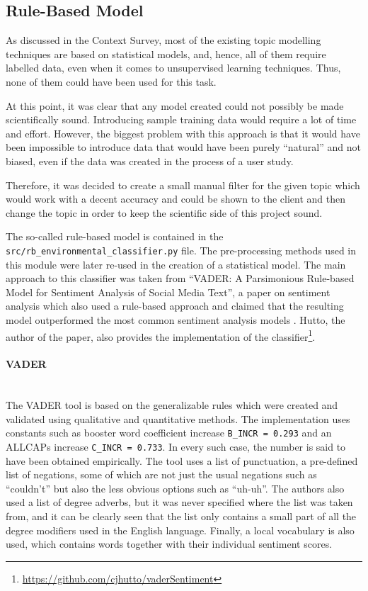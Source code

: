 \subsection{Rule-Based Model}
As discussed in the Context Survey, most of the existing topic modelling techniques are based on statistical models, and, hence, all of them require labelled data, even when it comes to unsupervised learning techniques. Thus, none of them could have been used for this task. 

At this point, it was clear that any model created could not possibly be made scientifically sound. Introducing sample training data would require a lot of time and effort. However, the biggest problem with this approach is that it would have been impossible to introduce data that would have been purely ``natural'' and not biased, even if the data was created in the process of a user study. 

Therefore, it was decided to create a small manual filter for the given topic which would work with a decent accuracy and could be shown to the client and then change the topic in order to keep the scientific side of this project sound. 

The so-called rule-based model is contained in the \texttt{src/rb\_environmental\_classifier.py} file. The pre-processing methods used in this module were later re-used in the creation of a statistical model. The main approach to this classifier was taken from ``VADER: A Parsimonious Rule-based Model for Sentiment Analysis of Social Media Text'', a paper on sentiment analysis which also used a rule-based approach and claimed that the resulting model outperformed the most common sentiment analysis models \cite{hutto2014vader}. Hutto, the author of the paper, also provides the implementation of the classifier\footnote{\url{https://github.com/cjhutto/vaderSentiment}}. 

\paragraph{VADER}\mbox{}\\
The VADER tool is based on the generalizable rules which were created and validated using qualitative
and quantitative methods. The implementation uses constants such as booster word coefficient increase \texttt{B\_INCR = 0.293} and an ALLCAPs increase \texttt{C\_INCR = 0.733}. In every such case, the number is said to have been obtained empirically. The tool uses a list of punctuation, a pre-defined list of negations, some of which are not just the usual negations such as ``couldn't'' but also the less obvious options such as ``uh-uh''. The authors also used a list of degree adverbs, but it was never specified where the list was taken from, and it can be clearly seen that the list only contains a small part of all the degree modifiers used in the English language. Finally, a local vocabulary is also used, which contains words together with their individual sentiment scores.

